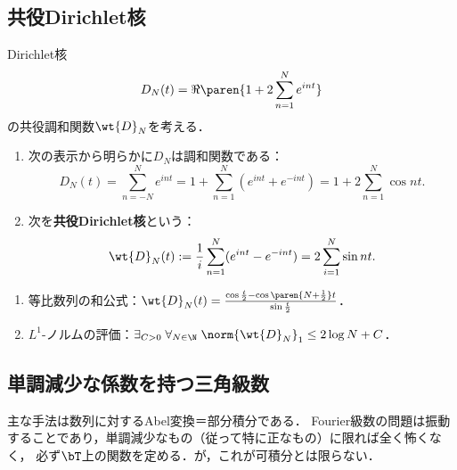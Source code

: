 \documentclass[uplatex,dvipdfmx]{jsreport}
\begin{document}
\subsection{共役Dirichlet核}

\begin{tcolorbox}[colframe=ForestGreen, colback=ForestGreen!10!white,breakable,colbacktitle=ForestGreen!40!white,coltitle=black,fonttitle=\bfseries\sffamily,
title=]
    Dirichlet核
    \[D_N(t)=\Re\paren{1+2\sum_{n=1}^Ne^{int}}\]
    の共役調和関数$\wt{D}_N$を考える．
\end{tcolorbox}

\begin{definition}\mbox{}
    \begin{enumerate}
        \item 次の表示から明らかに$D_N$は調和関数である：
        \[D_N(t)=\sum_{n=-N}^Ne^{int}=1+\sum_{n=1}^N(e^{int}+e^{-int})=1+2\sum_{n=1}^N\cos nt.\]
        \item 次を\textbf{共役Dirichlet核}という：
        \[\wt{D}_N(t):=\frac{1}{i}\sum_{n=1}^N(e^{int}-e^{-int})=2\sum_{i=1}^N\sin nt.\]
    \end{enumerate}
\end{definition}

\begin{lemma}\mbox{}
    \begin{enumerate}
        \item 等比数列の和公式：$\wt{D}_N(t)=\frac{\cos\frac{t}{2}-\cos\paren{N+\frac{1}{2}}t}{\sin\frac{t}{2}}$．
        \item $L^1$-ノルムの評価：$\exists_{C>0}\;\forall_{N\in\N}\;\norm{\wt{D}_N}_1\le 2\log N+C$．
    \end{enumerate}
\end{lemma}

\subsection{単調減少な係数を持つ三角級数}

\begin{tcolorbox}[colframe=ForestGreen, colback=ForestGreen!10!white,breakable,colbacktitle=ForestGreen!40!white,coltitle=black,fonttitle=\bfseries\sffamily,
title=]
    主な手法は数列に対するAbel変換＝部分積分である．
    Fourier級数の問題は振動することであり，単調減少なもの（従って特に正なもの）に限れば全く怖くなく，
    必ず$\bT$上の関数を定める．が，これが可積分とは限らない．
\end{tcolorbox}
\end{document}
